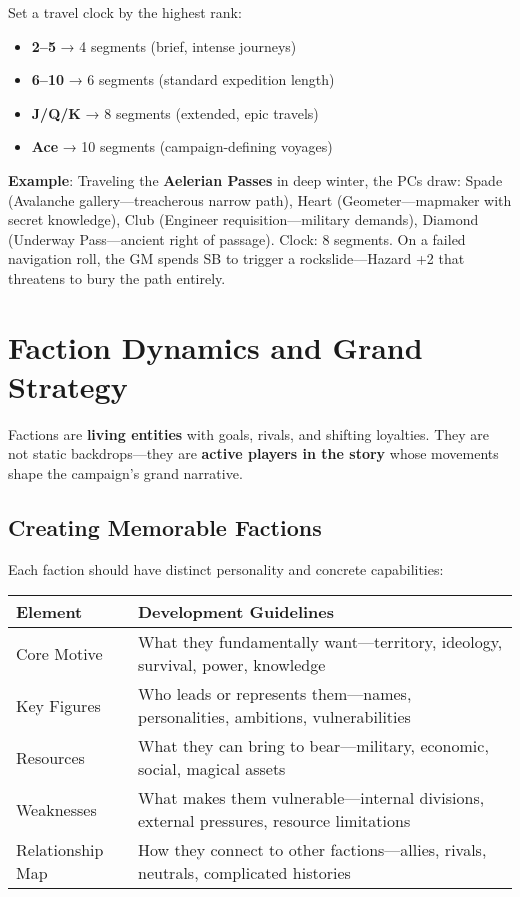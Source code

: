 Set a travel clock by the highest rank:
\begin{itemize}
    \item \textbf{2--5} → 4 segments (brief, intense journeys)
    \item \textbf{6--10} → 6 segments (standard expedition length)
    \item \textbf{J/Q/K} → 8 segments (extended, epic travels)
    \item \textbf{Ace} → 10 segments (campaign-defining voyages)
\end{itemize}

\textbf{Example}: Traveling the \textbf{Aelerian Passes} in deep winter, the PCs draw: Spade (Avalanche gallery---treacherous narrow path), Heart (Geometer---mapmaker with secret knowledge), Club (Engineer requisition---military demands), Diamond (Underway Pass---ancient right of passage). Clock: 8 segments. On a failed navigation roll, the GM spends SB to trigger a rockslide---Hazard +2 that threatens to bury the path entirely.

\section*{Faction Dynamics and Grand Strategy}

Factions are \textbf{living entities} with goals, rivals, and shifting loyalties. They are not static backdrops---they are \textbf{active players in the story} whose movements shape the campaign's grand narrative.

\subsection*{Creating Memorable Factions}

Each faction should have distinct personality and concrete capabilities:

\begin{fatebox}
\begin{tabularx}{\textwidth}{lX}
\toprule
\textbf{Element} & \textbf{Development Guidelines} \\
\midrule
Core Motive & What they fundamentally want---territory, ideology, survival, power, knowledge \\
Key Figures & Who leads or represents them---names, personalities, ambitions, vulnerabilities \\
Resources & What they can bring to bear---military, economic, social, magical assets \\
Weaknesses & What makes them vulnerable---internal divisions, external pressures, resource limitations \\
Relationship Map & How they connect to other factions---allies, rivals, neutrals, complicated histories \\
\bottomrule
\end{tabularx}
\end{fatebox}

